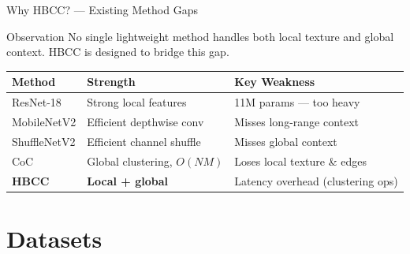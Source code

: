 \documentclass{beamer}
\begin{document}
\begin{frame}{Why HBCC? --- Existing Method Gaps}
  \begin{block}{Observation}
    No single lightweight method handles both local texture and
    global context. HBCC is designed to bridge this gap.
  \end{block}

  \vspace{0.5em}
  \begin{tabular}{lp{3.0cm}p{3.6cm}}
    \toprule
    \textbf{Method} & \textbf{Strength} & \textbf{Key Weakness} \\
    \midrule
    ResNet-18     & Strong local features      & 11M params --- too heavy \\[4pt]
    MobileNetV2   & Efficient depthwise conv   & Misses long-range context \\[4pt]
    ShuffleNetV2  & Efficient channel shuffle  & Misses global context \\[4pt]
    CoC           & Global clustering, $O(NM)$ & Loses local texture \& edges \\[4pt]
    \textbf{HBCC} & \textbf{Local + global}    & Latency overhead (clustering ops) \\
    \bottomrule
  \end{tabular}
\end{frame}

\section{Datasets}
\end{document}
